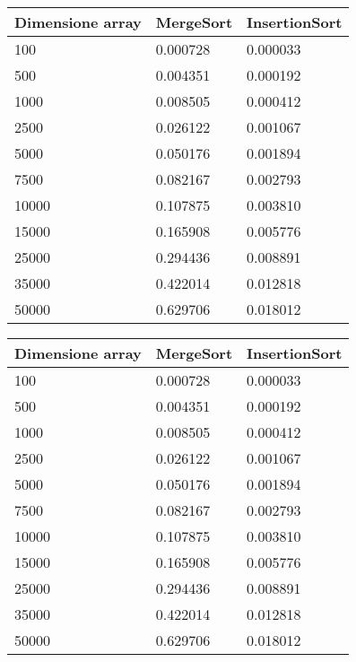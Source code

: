 \begin{tabular}{|l|l|l|}
\toprule
 Dimensione array &  MergeSort &  InsertionSort \\
\midrule
              100 &   0.000728 &       0.000033 \\
              500 &   0.004351 &       0.000192 \\
             1000 &   0.008505 &       0.000412 \\
             2500 &   0.026122 &       0.001067 \\
             5000 &   0.050176 &       0.001894 \\
             7500 &   0.082167 &       0.002793 \\
            10000 &   0.107875 &       0.003810 \\
            15000 &   0.165908 &       0.005776 \\
            25000 &   0.294436 &       0.008891 \\
            35000 &   0.422014 &       0.012818 \\
            50000 &   0.629706 &       0.018012 \\
\bottomrule
\end{tabular}
\begin{tabular}{|l|l|l|}
\toprule
 Dimensione array &  MergeSort &  InsertionSort \\ \hline

\midrule
              100 &   0.000728 &       0.000033 \\ \hline

              500 &   0.004351 &       0.000192 \\ \hline

             1000 &   0.008505 &       0.000412 \\ \hline

             2500 &   0.026122 &       0.001067 \\ \hline

             5000 &   0.050176 &       0.001894 \\ \hline

             7500 &   0.082167 &       0.002793 \\ \hline

            10000 &   0.107875 &       0.003810 \\ \hline

            15000 &   0.165908 &       0.005776 \\ \hline

            25000 &   0.294436 &       0.008891 \\ \hline

            35000 &   0.422014 &       0.012818 \\ \hline

            50000 &   0.629706 &       0.018012 \\ \hline

\bottomrule
\end{tabular}
